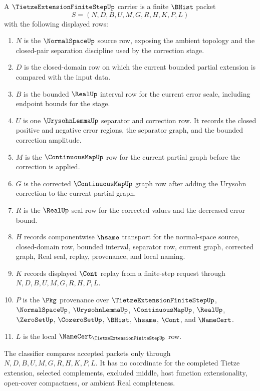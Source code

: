 \begin{definition}
\label{def:tietze-extension-finite-step-carrier}
A $\TietzeExtensionFiniteStepUp$ carrier is a finite $\BHist$ packet
$$
S=(N,D,B,U,M,G,R,H,K,P,L)
$$
with the following displayed rows:
\begin{enumerate}
\item $N$ is the $\NormalSpaceUp$ source row, exposing the ambient topology and the closed-pair separation discipline used by the correction stage.
\item $D$ is the closed-domain row on which the current bounded partial extension is compared with the input data.
\item $B$ is the bounded $\RealUp$ interval row for the current error scale, including endpoint bounds for the stage.
\item $U$ is one $\UrysohnLemmaUp$ separator and correction row. It records the closed positive and negative error regions, the separator graph, and the bounded correction amplitude.
\item $M$ is the $\ContinuousMapUp$ row for the current partial graph before the correction is applied.
\item $G$ is the corrected $\ContinuousMapUp$ graph row after adding the Urysohn correction to the current partial graph.
\item $R$ is the $\RealUp$ seal row for the corrected values and the decreased error bound.
\item $H$ records componentwise $\hsame$ transport for the normal-space source, closed-domain row, bounded interval, separator row, current graph, corrected graph, Real seal, replay, provenance, and local naming.
\item $K$ records displayed $\Cont$ replay from a finite-step request through $N,D,B,U,M,G,R,H,P,L$.
\item $P$ is the $\Pkg$ provenance over $\TietzeExtensionFiniteStepUp$, $\NormalSpaceUp$, $\UrysohnLemmaUp$, $\ContinuousMapUp$, $\RealUp$, $\ZeroSetUp$, $\CozeroSetUp$, $\BHist$, $\hsame$, $\Cont$, and $\NameCert$.
\item $L$ is the local $\NameCert_{\TietzeExtensionFiniteStepUp}$ row.
\end{enumerate}
The classifier compares accepted packets only through $N,D,B,U,M,G,R,H,K,P,L$. It has no coordinate for the completed Tietze extension, selected complements, excluded middle, host function extensionality, open-cover compactness, or ambient Real completeness.
\end{definition}

